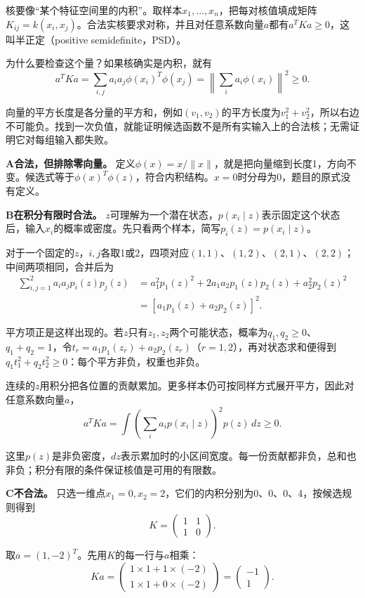 核要像“某个特征空间里的内积”。取样本\(x_1,\ldots,x_n\)，把每对核值填成矩阵\(K_{ij}=k(x_i,x_j)\)。合法实核要求对称，并且对任意系数向量\(a\)都有\(a^TKa\ge0\)，这叫半正定（positive semidefinite，PSD）。


为什么要检查这个量？如果核确实是内积，就有
\[
a^TKa=\sum_{i,j}a_i a_j\phi(x_i)^T\phi(x_j)
=\left\|\sum_i a_i\phi(x_i)\right\|^2\ge0.
\]


向量的平方长度是各分量的平方和，例如\((v_1,v_2)\)的平方长度为\(v_1^2+v_2^2\)，所以右边不可能负。找到一次负值，就能证明候选函数不是所有实输入上的合法核；无需证明它对每组输入都失败。


\textbf{A合法，但排除零向量。} 定义\(\phi(x)=x/\|x\|\)，就是把向量缩到长度1，方向不变。候选式等于\(\phi(x)^T\phi(z)\)，符合内积结构。\(x=0\)时分母为0，题目的原式没有定义。


\textbf{B在积分有限时合法。} \(z\)可理解为一个潜在状态，\(p(x_i\mid z)\)表示固定这个状态后，输入\(x_i\)的概率或密度。先只看两个样本，简写\(p_i(z)=p(x_i\mid z)\)。


对于一个固定的\(z\)，\(i,j\)各取1或2，四项对应\((1,1)\)、\((1,2)\)、\((2,1)\)、\((2,2)\)；中间两项相同，合并后为
\[
\begin{aligned}
\sum_{i,j=1}^{2}a_i a_j p_i(z)p_j(z)
&=a_1^2p_1(z)^2+2a_1a_2p_1(z)p_2(z)+a_2^2p_2(z)^2\\
&=[a_1p_1(z)+a_2p_2(z)]^2.
\end{aligned}
\]


平方项正是这样出现的。若\(z\)只有\(z_1,z_2\)两个可能状态，概率为\(q_1,q_2\ge0\)、\(q_1+q_2=1\)，令\(t_r=a_1p_1(z_r)+a_2p_2(z_r)\)（\(r=1,2\)），再对状态求和便得到\(q_1t_1^2+q_2t_2^2\ge0\)：每个平方非负，权重也非负。


连续的\(z\)用积分把各位置的贡献累加。更多样本仍可按同样方式展开平方，因此对任意系数向量\(a\)，
\[
a^TKa=\int\left(\sum_i a_i p(x_i\mid z)\right)^2p(z)\,dz\ge0.
\]


这里\(p(z)\)是非负密度，\(dz\)表示累加时的小区间宽度。每一份贡献都非负，总和也非负；积分有限的条件保证核值是可用的有限数。


\textbf{C不合法。} 只选一维点\(x_1=0,x_2=2\)，它们的内积分别为0、0、0、4，按候选规则得到
\[
K=\begin{pmatrix}1&1\\1&0\end{pmatrix}.
\]


取\(a=(1,-2)^T\)。先用\(K\)的每一行与\(a\)相乘：
\[
Ka=\begin{pmatrix}1\times1+1\times(-2)\\1\times1+0\times(-2)\end{pmatrix}
=\begin{pmatrix}-1\\1\end{pmatrix}.
\]


